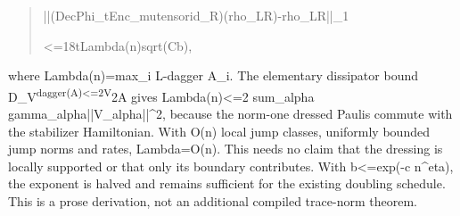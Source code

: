 \documentclass[
]{article}
\begin{document}
\begin{quote}\small\ttfamily\raggedright\setlength{\parskip}{0pt}
\noindent |\allowbreak{}|\allowbreak{}(\allowbreak{}D\allowbreak{}e\allowbreak{}c\allowbreak{}\hspace*{0.525em}\allowbreak{}P\allowbreak{}h\allowbreak{}i\allowbreak{}\_\allowbreak{}t\allowbreak{}\hspace*{0.525em}\allowbreak{}E\allowbreak{}n\allowbreak{}c\allowbreak{}\_\allowbreak{}m\allowbreak{}u\allowbreak{}\hspace*{0.525em}\allowbreak{}t\allowbreak{}e\allowbreak{}n\allowbreak{}s\allowbreak{}o\allowbreak{}r\allowbreak{}\hspace*{0.525em}\allowbreak{}i\allowbreak{}d\allowbreak{}\_\allowbreak{}R\allowbreak{})\allowbreak{}(\allowbreak{}r\allowbreak{}h\allowbreak{}o\allowbreak{}\_\allowbreak{}L\allowbreak{}R\allowbreak{})\allowbreak{}-\allowbreak{}r\allowbreak{}h\allowbreak{}o\allowbreak{}\_\allowbreak{}L\allowbreak{}R\allowbreak{}|\allowbreak{}|\allowbreak{}\_\allowbreak{}1\par
\noindent \hspace*{0.525em}\allowbreak{}\hspace*{0.525em}\allowbreak{}\hspace*{0.525em}\allowbreak{}<\allowbreak{}=\allowbreak{}\hspace*{0.525em}\allowbreak{}1\allowbreak{}8\allowbreak{}t\allowbreak{}\hspace*{0.525em}\allowbreak{}L\allowbreak{}a\allowbreak{}m\allowbreak{}b\allowbreak{}d\allowbreak{}a\allowbreak{}(\allowbreak{}n\allowbreak{})\allowbreak{}\hspace*{0.525em}\allowbreak{}s\allowbreak{}q\allowbreak{}r\allowbreak{}t\allowbreak{}(\allowbreak{}C\allowbreak{}b\allowbreak{})\allowbreak{},\par
\end{quote}

where
L\allowbreak{}a\allowbreak{}m\allowbreak{}b\allowbreak{}d\allowbreak{}a\allowbreak{}(\allowbreak{}n\allowbreak{})\allowbreak{}=\allowbreak{}m\allowbreak{}a\allowbreak{}x\allowbreak{}\_\allowbreak{}i
\textbar\textbar L-dagger A\_i\textbar\textbar. The elementary
dissipator bound
\textbar\textbar D\_V\textsuperscript{dagger(A)\textbar\textbar\textless=2\textbar\textbar V\textbar\textbar{}}2\textbar\textbar A\textbar\textbar{}
gives Lambda(n)\textless=2 sum\_alpha
g\allowbreak{}a\allowbreak{}m\allowbreak{}m\allowbreak{}a\allowbreak{}\_\allowbreak{}a\allowbreak{}l\allowbreak{}p\allowbreak{}h\allowbreak{}a\allowbreak{}|\allowbreak{}|\allowbreak{}V\allowbreak{}\_\allowbreak{}a\allowbreak{}l\allowbreak{}p\allowbreak{}h\allowbreak{}a\allowbreak{}|\allowbreak{}|\allowbreak{}\^{}\allowbreak{}2\allowbreak{},
because the norm-one dressed Paulis commute with the stabilizer
Hamiltonian. With O(n) local jump classes, uniformly bounded jump norms
and rates, Lambda=O(n). This needs no claim that the dressing is locally
supported or that only its boundary contributes. With b\textless=exp(-c
n\^{}eta), the exponent is halved and remains sufficient for the
existing doubling schedule. This is a prose derivation, not an
additional compiled trace-norm theorem.
\end{document}
